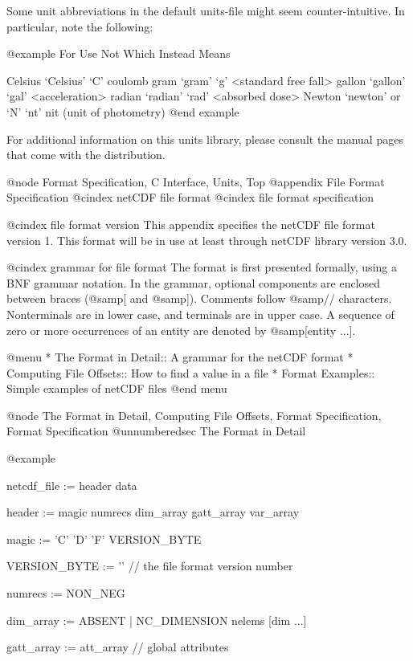 {Some unit abbreviations in the default units-file might seem
counter-intuitive.  In particular, note the following:

@example
For       Use               Not     Which Instead Means

Celsius   `Celsius'         `C'     coulomb
gram      `gram'            `g'     <standard free fall>
gallon    `gallon'          `gal'   <acceleration>
radian    `radian'          `rad'   <absorbed dose>
Newton    `newton' or `N'   `nt'    nit (unit of photometry)
@end example

For additional information on this units library, please consult the manual
pages that come with the distribution.

@node Format Specification, C Interface, Units, Top
@appendix File Format Specification
@cindex netCDF file format
@cindex file format specification

@cindex file format version
This appendix specifies the netCDF file format version 1.  This format
will be in use at least through netCDF library version 3.0.

@cindex grammar for file format
The format is first presented formally, using a BNF grammar notation.
In the grammar, optional components are enclosed between braces
(@samp{[} and @samp{]}).
Comments follow @samp{//}
characters.
Nonterminals are in lower case, and terminals are in upper
case.
A sequence of zero or more occurrences of an
entity are denoted by @samp{[entity ...]}.

@menu
* The Format in Detail::        A grammar for the netCDF format
* Computing File Offsets::      How to find a value in a file
* Format Examples::             Simple examples of netCDF files
@end menu

@node The Format in Detail, Computing File Offsets, Format Specification, Format Specification
@unnumberedsec The Format in Detail

@example

netcdf_file := header  data

header  := magic  numrecs  dim_array  gatt_array  var_array

magic   := 'C'  'D'  'F'  VERSION_BYTE

VERSION_BYTE := ''    // the file format version number

numrecs    := NON_NEG

dim_array  :=  ABSENT | NC_DIMENSION  nelems  [dim ...]

gatt_array :=  att_array  // global attributes

}
